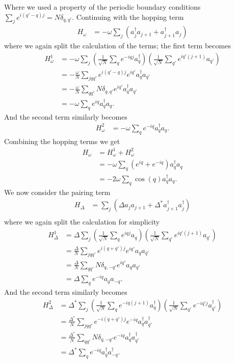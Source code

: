 Where we used a property of the periodic boundary conditions $\sum_j e^{i(q'-q)j} = N \delta_{q,q'}$. Continuing with the hopping term
\begin{align}
    H_\omega &= -\omega \sum_j \left(a_j^\dagger a_{j+1} + a_{j+1}^\dagger a_j \right)
\end{align}
where we again split the calculation of the terms; the first term becomes
\begin{align}
    H_\omega^1 &= -\omega \sum_j \left( \frac{1}{\sqrt{N}} \sum_q e^{-iqj}a_q^\dagger \right) \left( \frac{1}{\sqrt{N}} \sum_{q'} e^{iq'(j+1)}a_{q'} \right)\\
    &= - \frac{\omega}{N} \sum_{j q q'} e^{i(q'-q)j}e^{iq'} a_q^\dagger a_{q'}\\
    &= -\frac{\omega}{N} \sum_{qq'} N \delta_{q,q'}e^{iq'} a_q^\dagger a_{q'}\\
    &= -\omega \sum_q e^{iq} a_q^\dagger a_{q}.
\end{align}
And the second term similarly becomes
\begin{align}
    H_\omega^2 &= -\omega \sum_q e^{-iq} a_q^\dagger a_q.
\end{align}
Combining the hopping terms we get
\begin{align}
    H_\omega &= H_\omega^1 + H_\omega^2 \\
    &= -\omega \sum_q \left( e^{iq} + e^{-iq} \right) a_q^\dagger a_q\\
    &= - 2 \omega \sum_q \cos(q) a_q^\dagger a_q.
\end{align}
We now consider the pairing term
\begin{align}
    H_\Delta &= \sum_j \left( \Delta a_j a_{j+1} + \Delta^* a_{j+1}^\dagger a_j^\dagger \right)\\
\end{align}
where we again split the calculation for simplicity
\begin{align}
    H_\Delta^1 &= \Delta \sum_j \left( \frac{1}{\sqrt{N}} \sum_q e^{iqj}a_q \right) \left( \frac{1}{\sqrt{N}} \sum_{q'} e^{iq'(j+1)}a_{q'} \right)\\
    &= \frac{\Delta}{N} \sum_{jqq'} e^{i (q + q') j} e^{iq'} a_q a_{q'}\\
    &= \frac{\Delta}{N} \sum_{qq'} N \delta_{q, -q'} e^{iq'} a_q a_{q'}\\
    &= \Delta \sum_q e^{-iq} a_q a_{-q}.
\end{align}
And the second term similarly becomes
\begin{align}
    H_\Delta^2 &= \Delta^* \sum_j \left(  \frac{1}{\sqrt{N}} \sum_q e^{-iq(j+1)}a_q^\dagger  \right) \left(  \frac{1}{\sqrt{N}} \sum_{q'} e^{-iq'j}a_{q'}^\dagger    \right)\\
    &= \frac{\Delta^*}{N} \sum_{jqq'} e^{-i(q+q')j} e^{-iq} a_q^\dagger a_{q'}^\dagger \\
    &= \frac{\Delta^*}{N} \sum_{qq'} N \delta_{q, -q'} e^{-iq} a_q^\dagger a_{q'}^\dagger \\
    &= \Delta^* \sum_{q} e^{-iq} a_q^\dagger a_{-q}^\dagger.
\end{align}
